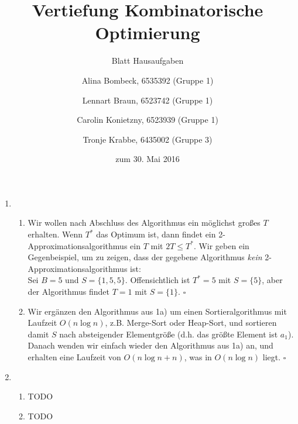 \documentclass[a4paper]{scrartcl}
\title{Vertiefung Kombinatorische Optimierung}
\subtitle{Blatt {\blattnr} Hausaufgaben}
\author{%
    Alina Bombeck, 6535392 (Gruppe 1) \and
    Lennart Braun, 6523742 (Gruppe 1) \and
    Carolin Konietzny, 6523939 (Gruppe 1) \and
    Tronje Krabbe, 6435002 (Gruppe 3)
}
\date{zum 30. Mai 2016}
\begin{document}
\maketitle


\begin{enumerate}[label=\bfseries \arabic*.]
\item %
\begin{enumerate}
    \item %
        Wir wollen nach Abschluss des Algorithmus ein möglichst großes $T$ erhalten.
        Wenn $T^*$ das Optimum ist, dann findet ein 2-Approximationsalgorithmus
        ein $T$ mit $2T \leq T^*$.
        Wir geben ein Gegenbeispiel, um zu zeigen, dass der gegebene Algorithmus
        \textit{kein} 2-Approximationsalgorithmus ist:\\
        Sei $B = 5$ und $S = \{1, 5, 5\}$. Offensichtlich ist $T^* = 5$
        mit $S= \{5\}$, aber der Algorithmus findet $T = 1$ mit $S = \{1\}$.
        $\square$
    \item %
        Wir ergänzen den Algorithmus aus 1a) um einen Sortieralgorithmus
        mit Laufzeit $O(n \log n)$, z.B. Merge-Sort oder Heap-Sort, und
        sortieren damit $S$ nach absteigender Elementgröße (d.h. das größte
        Element ist $a_1$).
        Danach wenden wir einfach wieder den Algorithmus aus 1a) an, und erhalten
        eine Laufzeit von $O(n \log n + n)$, was in $O(n \log n)$ liegt.
        $\square$

\end{enumerate}

\item %
\begin{enumerate}
    \item %
        TODO
    \item %
        TODO
\end{enumerate}

\end{enumerate}
\end{document}
